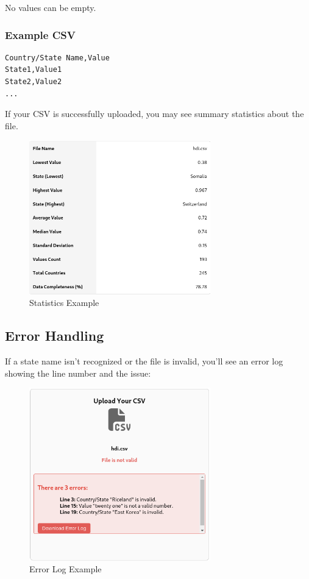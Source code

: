 \documentclass{article}
\begin{document}
\noindent
No values can be empty.

\subsubsection*{Example CSV}

\begin{verbatim}
Country/State Name,Value
State1,Value1
State2,Value2
...
\end{verbatim}

If your CSV is successfully uploaded, you may see summary statistics about the file.

\begin{figure}[h!]
  \centering
  \includegraphics[width=0.7\textwidth]{stats.png}
  \caption{Statistics Example}
\end{figure}

\subsection{Error Handling}

If a state name isn’t recognized or the file is invalid, you’ll see an 
error log showing the line number and the issue:

\begin{figure}[h!]
  \centering
  \includegraphics[width=0.7\textwidth]{error.png}
  \caption{Error Log Example}
\end{figure}
\end{document}
